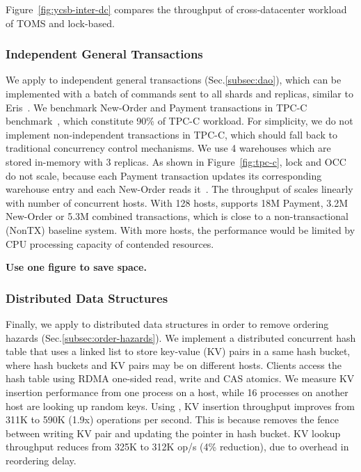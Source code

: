 Figure~\ref{fig:ycsb-inter-dc} compares the throughput of cross-datacenter workload of TOMS and lock-based.
\fi

\subsubsection{Independent General Transactions}
\label{subsec:eval-transactions}

We apply \sys to independent general transactions (Sec.\ref{subsec:dao}), which can be implemented with a batch of commands sent to all shards and replicas, similar to Eris~\cite{eris}.
We benchmark New-Order and Payment transactions in TPC-C benchmark~\cite{tpcc}, which constitute 90\% of TPC-C workload.
For simplicity, we do not implement non-independent transactions in TPC-C, which should fall back to traditional concurrency control mechanisms.
We use 4 warehouses which are stored in-memory with 3 replicas.
As shown in Figure~\ref{fig:tpc-c}, lock and OCC do not scale, because each Payment transaction updates its corresponding warehouse entry and each New-Order reads it~\cite{yu2014staring}.
The throughput of \sys scales linearly with number of concurrent hosts. With 128 hosts, \sys supports 18M Payment, 3.2M New-Order or 5.3M combined transactions, which is close to a non-transactional (NonTX) baseline system. With more hosts, the performance would be limited by CPU processing capacity of contended resources.

\textbf{Use one figure to save space.}

\subsubsection{Distributed Data Structures}
\label{subsec:eval-transactions}

Finally, we apply \sys{} to distributed data structures in order to remove ordering hazards (Sec.\ref{subsec:order-hazards}).
We implement a distributed concurrent hash table that uses a linked list to store key-value (KV) pairs in a same hash bucket, where hash buckets and KV pairs may be on different hosts.
Clients access the hash table using RDMA one-sided read, write and CAS atomics.
We measure KV insertion performance from one process on a host, while 16 processes on another host are looking up random keys.
Using \sys{}, KV insertion throughput improves from 311K to 590K (1.9x) operations per second.
This is because \sys{} removes the fence between writing KV pair and updating the pointer in hash bucket.
KV lookup throughput reduces from 325K to 312K op/s (4\% reduction), due to overhead in reordering delay.

